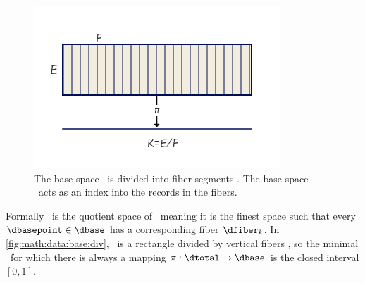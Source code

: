 \documentclass[../main.tex]{subfiles}
\begin{document}
\begin{figure}[H]
    \includegraphics[width=\linewidth]{figures/math/k_qspace.png}
    \caption{The base space \dtotal\ is divided into fiber segments \dfiber. The base space \dbase\ acts as an index into the records in the fibers.}
    \label{fig:math:data:base:div}
\end{figure}

Formally \dbase\ is the quotient space \cite{QuotientSpaceTopology2020} of \dtotal\, meaning it is the finest space\cite{aurouxMath131Introduction} such that every $\dbasepoint \in \dbase$ has a corresponding fiber $\dfiber_k$\cite{QuotientSpaceTopology2020}. In \autoref{fig:math:data:base:div}, \dtotal\ is a rectangle divided by vertical fibers \dfiber, so the minimal \dbase\ for which there is always a mapping $\pi: \dtotal\rightarrow \dbase$ is the closed interval $\left[0,1\right]$. 
\end{document}
